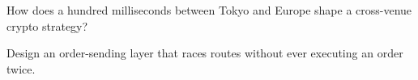 \begin{interviewq}\label{iq:nw:cross-region-crypto-networks:5}
How does a hundred milliseconds between Tokyo and Europe shape a cross-venue crypto strategy?
\end{interviewq}

\begin{interviewq}\label{iq:nw:cross-region-crypto-networks:6}
Design an order-sending layer that races routes without ever executing an order twice.
\end{interviewq}
